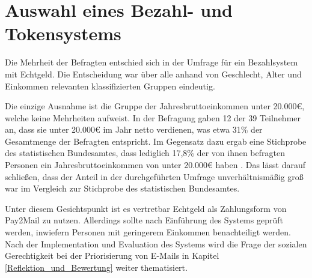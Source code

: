 \section{Auswahl eines Bezahl- und Tokensystems}
\label{Auswahl_eines_Bezahl-_und_Tokensystems}
Die Mehrheit der Befragten entschied sich in der Umfrage für ein Bezahlsystem mit Echtgeld. Die Entscheidung war über alle anhand von Geschlecht, Alter und Einkommen relevanten klassifizierten Gruppen eindeutig. 

Die einzige Ausnahme ist die Gruppe der Jahresbruttoeinkommen unter 20.000€, welche keine Mehrheiten aufweist. In der Befragung gaben 12 der 39 Teilnehmer an, dass sie unter 20.000€ im Jahr netto verdienen, was etwa 31\% der Gesamtmenge der Befragten entspricht. Im Gegensatz dazu ergab eine Stichprobe des statistischen Bundesamtes, dass lediglich 17,8\% der von ihnen befragten Personen ein Jahresbruttoeinkommen von unter 20.000€ haben \citep[S. 25 f.]{StatistischesBundesamt2018}. Das lässt darauf schließen, dass der Anteil in der durchgeführten Umfrage unverhältnismäßig groß war im Vergleich zur Stichprobe des statistischen Bundesamtes.

Unter diesem Gesichtspunkt ist es vertretbar Echtgeld als Zahlungsform von Pay2Mail zu nutzen. Allerdings sollte nach Einführung des Systems geprüft werden, inwiefern Personen mit geringerem Einkommen benachteiligt werden. Nach der Implementation und Evaluation des Systems wird die Frage der sozialen Gerechtigkeit bei der Priorisierung von E-Mails in Kapitel \ref{Reflektion_und_Bewertung} weiter thematisiert. 
